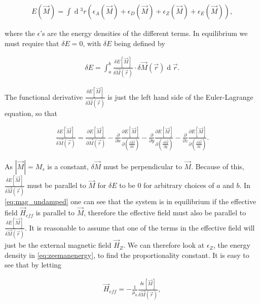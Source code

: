 \documentclass[1p]{elsarticle}		%
\renewcommand{\d}[1]{\ensuremath{\operatorname{d}\!{#1}}}
\numberwithin{equation}{section}
\begin{document}
\begin{align}
\label{eq:micromagneticenergy}
E(\vec{M}) = \int \d {^3} r (\epsilon_A(\vec{M}) + \epsilon_D(\vec{M}) + \epsilon_Z(\vec{M}) + \epsilon_E(\vec{M})),
\end{align}

where the $\epsilon$'s are the energy densities of the different terms. In equilibrium we must require that $\delta E=0$, with $\delta E$ being defined by

\begin{align}
\label{eq:deltaE}
\delta E = \int_a^b \frac{\delta E[\vec{M}]}{\delta \vec{M}(\vec{r})}\cdot \delta \vec{M}(\vec{r}) \d {\vec{r}}.
\end{align}

The functional derivative $\frac{\delta E[\vec{M}]}{\delta \vec{M}(\vec{r})}$ is just the left hand side of the Euler-Lagrange equation, so that

\begin{align}
\label{eq:functionaldiff}
\frac{\delta E[\vec{M}]}{\delta \vec{M}(\vec{r})} = \frac{\partial E[\vec{M}]}{\partial \vec{M}(\vec{r})} - \frac{\partial}{\partial x} \frac{\partial E[\vec{M}]}{\partial (\frac{\partial \vec{M}}{\partial x})} - \frac{\partial}{\partial y} \frac{\partial E[\vec{M}]}{\partial (\frac{\partial \vec{M}}{\partial y})} - \frac{\partial}{\partial z} \frac{\partial E[\vec{M}]}{\partial (\frac{\partial \vec{M}}{\partial z})}.
\end{align}

As $|\vec{M}| = M_s$ is a constant, $\delta \vec{M}$ must be perpendicular to $\vec{M}$. Because of this, $\frac{\delta E[\vec{M}]}{\delta \vec{M}(\vec{r})}$ must be parallel to $\vec{M}$ for $\delta E$ to be 0 for arbitrary choices of $a$ and $b$. In \eqref{eq:mag_undamped} one can see that the system is in equilibrium if the effective field $\vec{H}_{eff}$ is parallel to $\vec{M}$, therefore the effective field must also be parallel to $\frac{\delta E[\vec{M}]}{\delta \vec{M}(\vec{r})}$. It is reasonable to assume that one of the terms in the effective field will just be the external magnetic field $\vec{H}_Z$. We can therefore look at $\epsilon_Z$, the energy density in \eqref{eq:zeemanenergy}, to find the proportionality constant. It is easy to see that by letting

\begin{align}
\vec{H}_{eff} = -\frac{1}{\mu_0}\frac{\delta \epsilon[\vec{M}]}{\delta \vec{M}(\vec{r})},
\end{align}
\end{document}

